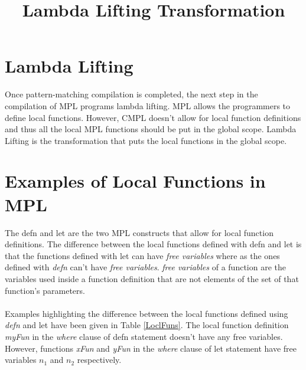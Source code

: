 \documentclass[11pt]{article}
\title{Lambda Lifting Transformation}
\begin{document}
\maketitle
\section {Lambda Lifting} 
Once pattern-matching compilation is completed, the next step in the compilation of MPL programs lambda lifting. MPL allows the programmers to define local functions. However, CMPL doesn't allow for local function definitions and thus all the local MPL functions should be put in the global scope. Lambda Lifting is the transformation that puts the local functions in the global scope.

\section {Examples of Local Functions in MPL}


The {\sf defn} and {\sf let} are the two MPL constructs that allow for local function definitions. The difference between the local functions defined with {\sf defn} and {\sf let} is that the functions defined with {\sf let} can have {\em free variables} where as the ones defined with {\em defn} can't have {\em free variables}. {\em free variables} of a function are the variables used inside a function definition that are not elements of the set of that function's parameters. 
~~\\~~\\ 
Examples highlighting the difference between the local functions defined using {\em defn} and {\sf let} have been given in Table \ref {LoclFuns}. The local function definition {\em myFun} in the {\em where} clause of {\sf defn} statement doesn't have any free variables. However, functions {\em xFun} and {\em yFun} in the {\em where} clause of {\sf let} statement have free variables $n_1$ and $n_2$ respectively.
\end{document}
